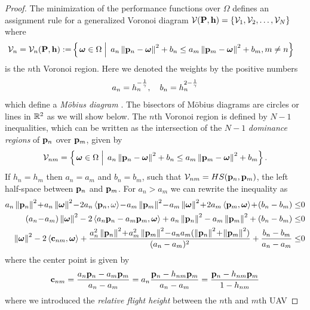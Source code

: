 \documentclass[smallabstract,smallcaptions]{dccpaper}
\newcommand{\gP}{\ensuremath{\vP}}          %
\newcommand{\bH}{\ensuremath{\vh}}          %
\newcommand{\Vor}{\ensuremath{\mathcal{V}}}         %
\begin{document}
%
\begin{proof}
  The minimization of the performance functions over $\Omega$ defines an assignment rule for a generalized Voronoi diagram
  $\Vor(\gP,\bH)=\{\Vor_1,\Vor_2,\dots,\Vor_N\}$ where 
  \begin{align}
    \Vor_{n} =\Vor_n(\gP,\bH):=
      &\set{\vome\in\Ome}{ a_n\Norm{\vp_n-\vome}^2 +b_n \leq  a_m\Norm{\vp_m-\vome}^2 +b_m, m\not=n}
  \end{align}
  is the $n$th Voronoi region. Here we denoted the weights by the positive numbers
  \begin{align}
    a_n = h_n^{-\frac{1}{\gamma}}, \quad b_n=h_n^{2-\frac{1}{\gamma}}
  \end{align}
  which define a \emph{M{\"o}bius diagram} \cite{BK06b,BWY07}. The bisectors of M{\"o}bius diagrams are circles or lines
  in ${\mathbb R}^2$ as we will show below.
  The $n$th Voronoi region is defined by $N-1$ inequalities, which  can be written as the intersection of the $N-1$
  \emph{dominance regions} of ${\mathbf p}_n$ over ${\mathbf p}_m$, given by 
  \begin{align}
    \Vor_{nm}=\set{\vome\in\Ome}{ a_n\Norm{\vp_n-\vome}^2 +b_n \leq  a_m\Norm{\vp_m-\vome}^2 +b_m}.
  \end{align}
  If $h_n=h_m$ then $a_n=a_m$ and $b_n=b_m$, such that $\Vor_{nm}=HS(\vp_n,\vp_m)$, the left half-space between ${\mathbf p}_n$
  and ${\mathbf p}_m$. For $a_n>a_m$ we can rewrite the inequality as 
  \begin{align*}
    a_n \Norm{\vp_n}^2\! +\! a_n \Norm{\vome}^2\! -\! 2a_n\skprod{\vp_n}{\ome} \!-\! a_m\Norm{\vp_m}^2 \!-\! a_m\Norm{\vome}^2
    \!+\!2a_m\skprod{\vp_m}{\vome} \!+\! (b_n-b_m) \leq &0\\
     (a_n\!-\!a_m)\Norm{\vome}^2 -2 \skprod{a_n \vp_n- a_m \vp_m}{\vome} + a_n \Norm{\vp_n}^2 - a_m \Norm{\vp_m}^2 +(b_n-b_m)
     \leq & 0 \\
      \Norm{\vome}^2 -2 \skprod{\vc_{nm}}{\vome} 
    + \frac{a_n^2 \Norm{\vp_n}^2 \!+\!a_m^2 \Norm{\vp_m}^2 \!-\! a_na_m(\Norm{\vp_n}^2 \!+\!\Norm{\vp_m}^2)}{(a_n-a_m)^2} + \frac{b_n-b_m}{a_n-a_m}
   \leq & 0
  \end{align*}
  where the center point is given by
  \begin{align}
    {\ensuremath{\mathbf c}}_{nm}=\frac{a_n{\mathbf p}_n- a_m{\mathbf p}_m}{a_n-a_m}=a_n \frac{{\mathbf p}_n-h_{nm} {\mathbf p}_m}{a_n -a_m}=\frac{{\mathbf p}_n -h_{nm}{\mathbf p}_m}{1-h_{nm}} 
  \end{align}
  where we introduced the \emph{relative flight height} between the $n$th and $m$th UAV

\end{proof}
\end{document}
